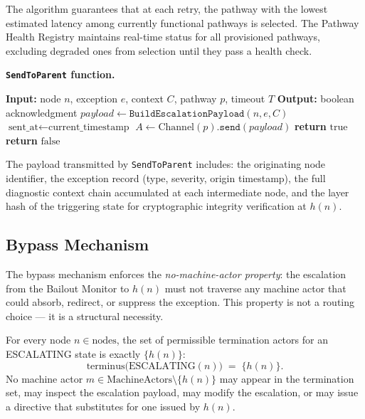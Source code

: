 The algorithm guarantees that at each retry, the pathway with the lowest estimated latency among currently functional pathways is selected. The Pathway Health Registry maintains real-time status for all provisioned pathways, excluding degraded ones from selection until they pass a health check.

\bigskip
\noindent\textbf{\texttt{SendToParent} function.}
\begin{algorithmic}
\STATE \textbf{Input:} node $n$, exception $e$, context $C$, pathway $p$, timeout $T$
\STATE \textbf{Output:} boolean acknowledgment
\STATE
\STATE $payload \leftarrow \texttt{BuildEscalationPayload}(n, e, C)$
\STATE $\text{sent\_at} \leftarrow \text{current\_timestamp}$
\STATE $A \leftarrow \text{Channel}(p). \texttt{send}(payload)$
\STATE
\STATE {}
        \STATE \textbf{return} $\text{true}$
    \ENDIF
\ENDWAITFOR
\STATE \textbf{return} $\text{false}$
\end{algorithmic}

The payload transmitted by \texttt{SendToParent} includes: the originating node identifier, the exception record (type, severity, origin timestamp), the full diagnostic context chain accumulated at each intermediate node, and the \fact{} layer hash of the triggering state for cryptographic integrity verification at $h(n)$.

\subsection{Bypass Mechanism}\label{sec:bypass}

The bypass mechanism enforces the \emph{no-machine-actor property}: the escalation from the Bailout Monitor to $h(n)$ must not traverse any machine actor that could absorb, redirect, or suppress the exception. This property is not a routing choice — it is a structural necessity.

\begin{definition}\label{def:bypass}
For every node $n \in \text{nodes}$, the set of permissible termination actors for an ESCALATING state is exactly $\{h(n)\}$:
\begin{equation}
\text{terminus}\bigl(\text{ESCALATING}(n)\bigr) \;=\; \{h(n)\}. \tag{BP}
\end{equation}
No machine actor $m \in \text{MachineActors} \setminus \{h(n)\}$ may appear in the termination set, may inspect the escalation payload, may modify the escalation, or may issue a directive that substitutes for one issued by $h(n)$.
\end{definition}

